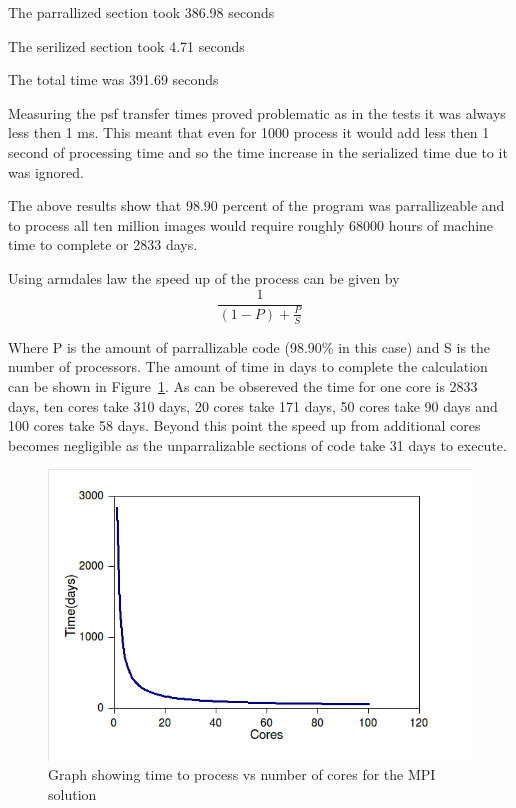 The parrallized section took 386.98 seconds

The serilized section took 4.71 seconds

The total time was 391.69 seconds

Measuring the psf transfer times proved problematic as in the tests it was always less then 1 ms. This meant that even for 1000 process it would add less then 1 second of processing time and so the time increase in the serialized time due to it was ignored.

The above results show that 98.90 percent of the program was parrallizeable and to process all ten million images would require roughly 68000 hours of machine time to complete or 2833 days.

Using armdales law the speed up of the process can be given by
\[
 \frac{1}{(1-P) + \frac{P}{S}}
\]

Where P is the amount of parrallizable code (98.90\% in this case) and S is the number of processors. The amount of time in days to complete the calculation can be shown in Figure~\ref{mpi-time-cores}. As can be obsereved the time for one core is 2833 days, ten cores take 310 days, 20 cores take 171 days, 50 cores take 90 days and 100 cores take 58 days. Beyond this point the speed up from additional cores becomes negligible as the unparralizable sections of code take 31 days to execute. 

\begin{figure}[ht]
	\begin{center}
		\includegraphics[width=1.0\textwidth]{mpi-time-cores}
	\end{center}
	\caption{Graph showing time to process vs number of cores for the MPI solution}
	\label{mpi-time-cores}
\end{figure}

